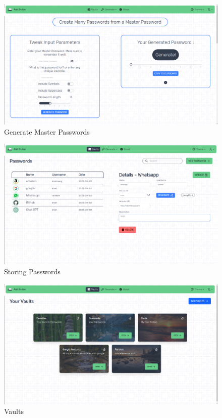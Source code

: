 \documentclass[11pt]{article}
\begin{document}
\begin{figure}[H]
    \centering
    \includegraphics[width=.95\textwidth]{../design/screenshots/master_light.png}
    \caption{Generate Master Passwords}
\end{figure}

\begin{figure}[H]
    \centering
    \includegraphics[width=.95\textwidth]{../design/screenshots/passwords_display_light.png}
    \caption{Storing Passwords}
\end{figure}

\begin{figure}[H]
    \centering
    \includegraphics[width=.95\textwidth]{../design/screenshots/vaults_light.png}
    \caption{Vaults}
\end{figure}
\end{document}
